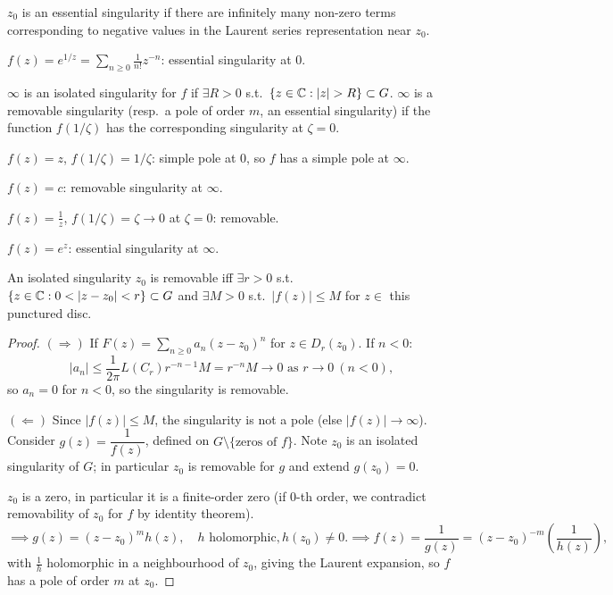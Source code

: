 \documentclass[11pt]{article}
\begin{document}
\begin{definition}
$z_0$ is an essential singularity if there are infinitely many non-zero terms corresponding to negative values in the Laurent series representation near $z_0$.
\end{definition}

\begin{example}
$f(z) = e^{1/z} = \sum_{n\ge0} \frac{1}{n!}z^{-n}$: essential singularity at $0$.
\end{example}

\begin{definition}
$\infty$ is an isolated singularity for $f$ if $\exists R>0$ s.t.\ $\{z\in\C : |z|>R\}\subset G$.
$\infty$ is a removable singularity (resp.\ a pole of order $m$, an essential singularity) if the function $f(1/\zeta)$ has the corresponding singularity at $\zeta=0$.
\end{definition}

\begin{example}
$f(z)=z$, $f(1/\zeta)=1/\zeta$: simple pole at $0$, so $f$ has a simple pole at $\infty$.
\end{example}
\begin{example}
$f(z)=c$: removable singularity at $\infty$.
\end{example}
\begin{example}
$f(z)=\frac1z$, $f(1/\zeta)=\zeta\to0$ at $\zeta=0$: removable.
\end{example}
\begin{example}
$f(z)=e^z$: essential singularity at $\infty$.
\end{example}

\begin{theorem}
An isolated singularity $z_0$ is removable iff $\exists r>0$ s.t.\ $\{z\in\C : 0<|z-z_0|<r\}\subset G$ and $\exists M>0$ s.t.\ $|f(z)|\le M$ for $z\in$ this punctured disc.
\end{theorem}

\begin{proof}
$(\Rightarrow)$ If $F(z) = \sum_{n\ge0} a_n(z-z_0)^n$ for $z \in D_r(z_0)$. If $n<0$:
\[
|a_n| \le \frac{1}{2\pi}L(C_r)r^{-n-1}M = r^{-n}M \to 0 \text{ as } r\to0 \ (n<0),
\]
so $a_n=0$ for $n<0$, so the singularity is removable.

$(\Leftarrow)$ Since $|f(z)|\le M$, the singularity is not a pole (else $|f(z)|\to\infty$). Consider $g(z) = \dfrac{1}{f(z)}$, defined on $G\setminus\{\text{zeros of }f\}$. Note $z_0$ is an isolated singularity of $G$; in particular $z_0$ is removable for $g$ and extend $g(z_0)=0$.

$z_0$ is a zero, in particular it is a finite-order zero (if $0$-th order, we contradict removability of $z_0$ for $f$ by identity theorem).
\[
\implies g(z) = (z-z_0)^mh(z), \quad h \text{ holomorphic}, h(z_0)\ne0. \implies f(z) = \frac{1}{g(z)} = (z-z_0)^{-m}\left(\frac{1}{h(z)}\right),
\]
with $\frac1h$ holomorphic in a neighbourhood of $z_0$, giving the Laurent expansion, so $f$ has a pole of order $m$ at $z_0$.
\end{proof}
\end{document}
